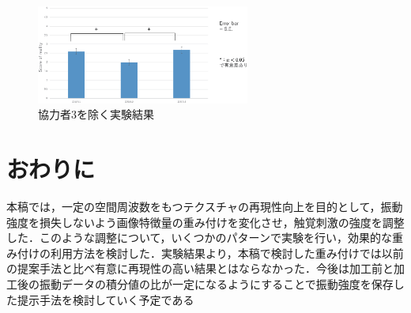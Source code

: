 \documentclass[a4paper]{jarticle}
\begin{document}
\begin{figure}[tb]
  \begin{center}
    \includegraphics*[width=70mm]{res3.eps}
  \end{center}
  \vspace*{-6mm}
  \caption{協力者3を除く実験結果}
  \label{fig7}
\end{figure}

\balance

\section{おわりに}
本稿では，一定の空間周波数をもつテクスチャの再現性向上を目的として，振動強度を損失しないよう画像特徴量の重み付けを変化させ，触覚刺激の強度を調整した．このような調整について，いくつかのパターンで実験を行い，効果的な重み付けの利用方法を検討した．実験結果より，本稿で検討した重み付けでは以前の提案手法と比べ有意に再現性の高い結果とはならなかった．今後は加工前と加工後の振動データの積分値の比が一定になるようにすることで振動強度を保存した提示手法を検討していく予定である





\end{document}
